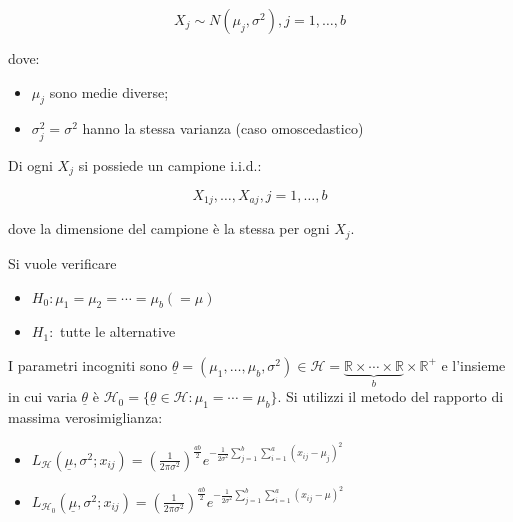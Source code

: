 \documentclass[hidelinks, 10pt]{report}
\begin{document}
\[ X_{j} \sim N(\mu_{j}, \sigma^{2}), j = 1, \dotsc, b \]

dove:
\begin{itemize}
\item $ \mu_{j} $ sono medie diverse;
\item $ \sigma^{2}_{j} = \sigma^{2} $ hanno la stessa varianza (caso omoscedastico)
\end{itemize}

Di ogni $ X_{j} $ si possiede un campione i.i.d.:

\[ X_{1j}, \dotsc, X_{aj}, j = 1, \dotsc, b \]

dove la dimensione del campione \`e la stessa per ogni $ X_{j} $.

Si vuole verificare
\begin{itemize}
\item $ H_{0}: \mu_{1} = \mu_{2} = \dotsb = \mu_{b} (= \mu) $
\item $ H_{1}: $ tutte le alternative
\end{itemize}

I parametri incogniti sono $ \underline{\theta} = (\mu_{1}, \dotsc, \mu_{b}, \sigma^{2}) \in \mathcal{H} = \underbrace{\mathbb{R} \times \dotsb \times \mathbb{R}}_{b} \times \mathbb{R}^{+} $ e l'insieme in cui varia $ \underline{\theta} $ \`e $ \mathcal{H}_{0} = \{ \underline{\theta} \in \mathcal{H} : \mu_{1} = \dotsb = \mu_{b} \} $. Si utilizzi il metodo del rapporto di massima verosimiglianza:

\begin{itemize}
\item $ L_{\mathcal{H}} (\underline{\mu}, \sigma^{2}; x_{ij}) = \left( \frac{1}{2 \pi \sigma^{2}} \right)^{\frac{ab}{2}} e^{- \frac{1}{2 \sigma^{2}} \sum\limits_{j = 1}^{b} \sum\limits_{i = 1}^{a} (x_{ij} - \mu_{j})^{2}} $
\item $ L_{\mathcal{H}_{0}} (\underline{\mu}, \sigma^{2}; x_{ij}) = \left( \frac{1}{2 \pi \sigma^{2}} \right)^{\frac{ab}{2}} e^{- \frac{1}{2 \sigma^{2}} \sum\limits_{j = 1}^{b} \sum\limits_{i = 1}^{a} (x_{ij} - \mu)^{2}} $
\end{itemize}
\end{document}
